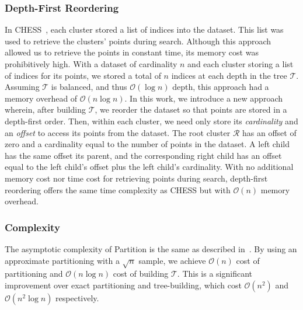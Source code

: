 \subsubsection{Depth-First Reordering}
\label{sec:methods:clustering:depth-first-reordering}

In CHESS~\cite{ishaq2019clustered}, each cluster stored a list of indices into the dataset.
This list was used to retrieve the clusters' points during search.
Although this approach allowed us to retrieve the points in constant time, its memory cost was prohibitively high.
With a dataset of cardinality $n$ and each cluster storing a list of indices for its points, we stored a total of $n$ indices at each depth in the tree $\mathcal{T}$.
Assuming $\mathcal{T}$ is balanced, and thus $\mathcal{O}(\log n)$ depth, this approach had a memory overhead of $\mathcal{O}(n \log n)$.
In this work, we introduce a new approach wherein, after building $\mathcal{T}$, we reorder the dataset so that points are stored in a depth-first order.
Then, within each cluster, we need only store its \textit{cardinality} and an \textit{offset} to access its points from the dataset.
The root cluster $\mathcal{R}$ has an offset of zero and a cardinality equal to the number of points in the dataset.
A left child has the same offset its parent, and the corresponding right child has an offset equal to the left child's offset plus the left child's cardinality.
With no additional memory cost nor time cost for retrieving points during search, depth-first reordering offers the same time complexity as CHESS but with $\mathcal{O}(n)$ memory overhead.


\subsubsection{Complexity}
\label{sec:methods:clustering:complexity}


The asymptotic complexity of Partition is the same as described in~\cite{ishaq2019clustered}.
By using an approximate partitioning with a $\sqrt{n}$ sample, we achieve $\mathcal{O}(n)$ cost of partitioning and $\mathcal{O}(n \log n)$ cost of building $\mathcal{T}$.
This is a significant improvement over exact partitioning and tree-building, which cost $\mathcal{O}(n^2)$ and $\mathcal{O}(n^2 \log n)$ respectively.


